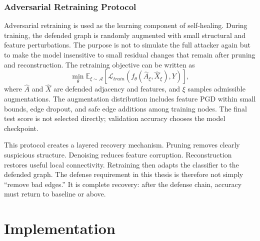 \documentclass[12pt,oneside]{report}
\begin{document}
\subsection{Adversarial Retraining Protocol}
Adversarial retraining is used as the learning component of self-healing. During training, the defended graph is randomly augmented with small structural and feature perturbations. The purpose is not to simulate the full attacker again but to make the model insensitive to small residual changes that remain after pruning and reconstruction. The retraining objective can be written as
\begin{equation}
\min_\theta \mathbb{E}_{\xi\sim \mathcal{A}}\left[
\mathcal{L}_{train}\left(f_\theta(\hat{A}_\xi,\hat{X}_\xi),Y\right)
\right],
\end{equation}
where \(\hat{A}\) and \(\hat{X}\) are defended adjacency and features, and \(\xi\) samples admissible augmentations. The augmentation distribution includes feature PGD within small bounds, edge dropout, and safe edge additions among training nodes. The final test score is not selected directly; validation accuracy chooses the model checkpoint.

This protocol creates a layered recovery mechanism. Pruning removes clearly suspicious structure. Denoising reduces feature corruption. Reconstruction restores useful local connectivity. Retraining then adapts the classifier to the defended graph. The defense requirement in this thesis is therefore not simply ``remove bad edges.'' It is complete recovery: after the defense chain, accuracy must return to baseline or above.

\chapter{Implementation}
\end{document}
